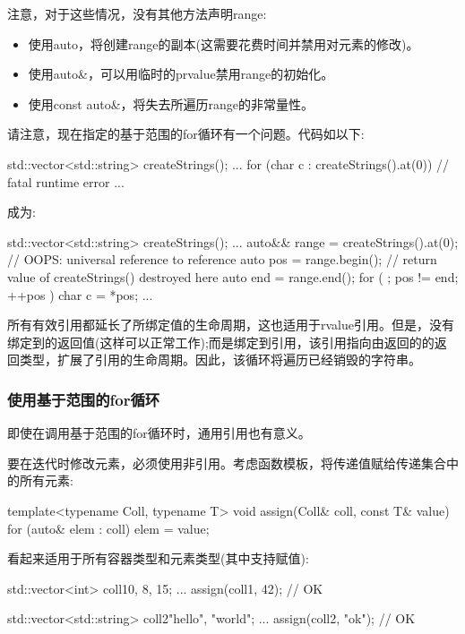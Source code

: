 注意，对于这些情况，没有其他方法声明range:

\begin{itemize}
	\item 使用auto，将创建range的副本(这需要花费时间并禁用对元素的修改)。
	\item 使用auto\&，可以用临时的prvalue禁用range的初始化。
	\item 使用const auto\&，将失去所遍历range的非常量性。
\end{itemize}

请注意，现在指定的基于范围的for循环有一个问题。代码如以下:

\begin{cppcode}
std::vector<std::string> createStrings();
...
for (char c : createStrings().at(0)) { // fatal runtime error
	...
}
\end{cppcode}

成为:

\begin{cppcode}
std::vector<std::string> createStrings();
...
auto&& range = createStrings().at(0); // OOPS: universal reference to reference
auto pos = range.begin(); // return value of createStrings() destroyed here
auto end = range.end();
for ( ; pos != end; ++pos ) {
	char c = *pos;
	...
}
\end{cppcode}

所有有效引用都延长了所绑定值的生命周期，这也适用于rvalue引用。但是，没有绑定到的返回值(这样可以正常工作);而是绑定到引用，该引用指向由返回的的返回类型，扩展了引用的生命周期。因此，该循环将遍历已经销毁的字符串。

\subsubsection{使用基于范围的for循环}

即使在调用基于范围的for循环时，通用引用也有意义。

要在迭代时修改元素，必须使用非引用。考虑函数模板，将传递值赋给传递集合中的所有元素:

\begin{cppcode}
template<typename Coll, typename T>
void assign(Coll& coll, const T& value) {
	for (auto& elem : coll) {
		elem = value;
	}
}
\end{cppcode}

看起来适用于所有容器类型和元素类型(其中支持赋值):

\begin{cppcode}
std::vector<int> coll1{0, 8, 15};
...
assign(coll1, 42); // OK

std::vector<std::string> coll2{"hello", "world"};
...
assign(coll2, "ok"); // OK
\end{cppcode}

